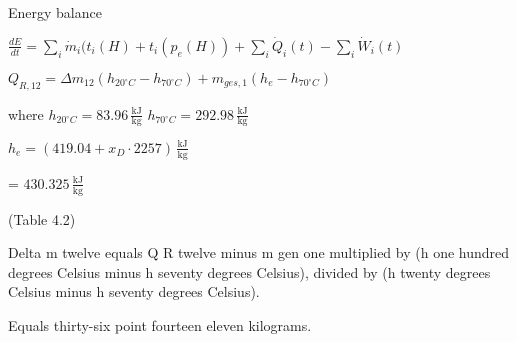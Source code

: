 Energy balance  

\( \frac{dE}{dt} = \sum_i \dot{m}_i(t_i(H) + t_i(p_e(H)) + \sum_i \dot{Q}_i(t) - \sum_i \dot{W}_i(t) \)  

\( Q_{R,12} = \Delta m_{12}(h_{20^\circ C} - h_{70^\circ C}) + m_{ges,1}(h_e - h_{70^\circ C}) \)  

where \( h_{20^\circ C} = 83.96 \, \frac{\text{kJ}}{\text{kg}} \)  
\( h_{70^\circ C} = 292.98 \, \frac{\text{kJ}}{\text{kg}} \)  

\( h_e = \left( 419.04 + x_D \cdot 2257 \right) \, \frac{\text{kJ}}{\text{kg}} \)  

= \( 430.325 \, \frac{\text{kJ}}{\text{kg}} \)  

(Table 4.2)

Delta m twelve equals Q R twelve minus m gen one multiplied by (h one hundred degrees Celsius minus h seventy degrees Celsius), divided by (h twenty degrees Celsius minus h seventy degrees Celsius).  

Equals thirty-six point fourteen eleven kilograms.